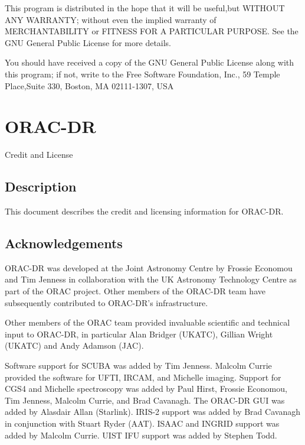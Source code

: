 \documentclass[twoside,11pt]{article}
\renewcommand{\_}{\texttt{\symbol{95}}}
\begin{document}
This program is distributed in the hope that it will be useful,but WITHOUT ANY
WARRANTY; without even the implied warranty of MERCHANTABILITY or FITNESS FOR A
PARTICULAR PURPOSE. See the GNU General Public License for more details.



You should have received a copy of the GNU General Public License along with
this program; if not, write to the Free Software Foundation, Inc., 59 Temple
Place,Suite 330, Boston, MA  02111-1307, USA


\section{ORAC-DR\label{ORAC-DR}}


Credit and License

\subsection*{Description\label{ORAC-DR_Description}}


This document describes the credit and licensing information for ORAC-DR.

\subsection*{Acknowledgements\label{ORAC-DR_Acknowledgements}}


ORAC-DR was developed at the Joint Astronomy Centre by
Frossie Economou and Tim Jenness in collaboration with the
UK Astronomy Technology Centre as part of the ORAC project.
Other members of the ORAC-DR team have subsequently contributed
to ORAC-DR's infrastructure.



Other members of the ORAC team provided invaluable scientific
and technical input to ORAC-DR, in particular Alan Bridger (UKATC),
Gillian Wright (UKATC) and Andy Adamson (JAC).



Software support for SCUBA was added by Tim Jenness.  Malcolm Currie
provided the software for UFTI, IRCAM, and Michelle imaging.  Support
for CGS4 and Michelle spectroscopy was added by Paul Hirst, Frossie
Economou, Tim Jenness, Malcolm Currie, and Brad Cavanagh.  The ORAC-DR
GUI was added by Alasdair Allan (Starlink). IRIS-2 support was added
by Brad Cavanagh in conjunction with Stuart Ryder (AAT). ISAAC and
INGRID support was added by Malcolm Currie. UIST IFU support was added
by Stephen Todd.
\end{document}
